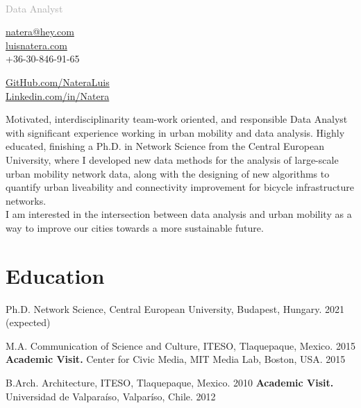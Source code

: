 \documentclass{academiccv}
\begin{document}
\raggedright

\namefont{\myname}\\
\vspace{1em}
\textcolor{darkgray}{{\Large Data Analyst}}

\vspace{1em}
\begin{minipage}[t]{0.495\textwidth}
  \href{mailto:natera@hey.com}{natera@hey.com}\\
  \href{https://luisnatera.com}{luisnatera.com} \\
  +36-30-846-91-65
\end{minipage}
\begin{minipage}[t]{0.495\textwidth}
	\href{https://github.com/nateraluis}{GitHub.com/NateraLuis}\\
	\href{https://www.linkedin.com/in/natera/}{Linkedin.com/in/Natera} \\
	
  \end{minipage}
\vspace{2.5em}

Motivated, interdisciplinarity team-work oriented, and responsible Data Analyst with significant experience working in urban mobility and data analysis. Highly educated, finishing a Ph.D. in Network Science from the Central European University, where I developed new data methods for the analysis of large-scale urban mobility network data, along with the designing of new algorithms to quantify urban liveability and connectivity improvement for bicycle infrastructure networks.\\
I am interested in the intersection between data analysis and urban mobility as a way to improve our cities towards a more sustainable future.

\section*{Education}
\begin{tablist}
	\item[Ph.D.] \tab Network Science, Central European University, Budapest, Hungary. 2021 (expected) 
	\item[M.A.]  \tab Communication of Science and Culture, ITESO, Tlaquepaque, Mexico. 2015 \\
		\subitem\textbf{Academic Visit.} Center for Civic Media, MIT Media Lab, Boston, USA. 2015
	\item[B.Arch.]  \tab Architecture,  ITESO, Tlaquepaque, Mexico. 2010
		\subitem\textbf{Academic Visit.} Universidad de Valparaíso, Valparíso, Chile. 2012 
\end{tablist}
\end{document}

